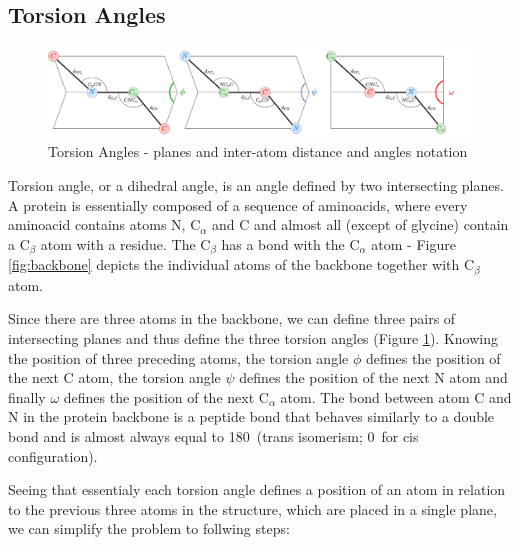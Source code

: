 \subsection{Torsion Angles}

\begin{figure}
    \centering
    \includegraphics[width=\linewidth]{imgs_tomas/torsion.png}
    \caption{Torsion Angles - planes and inter-atom distance and angles notation}
    \label{fig:torsion}
\end{figure}

Torsion angle, or a dihedral angle, is an angle defined by two intersecting planes. A protein is essentially composed of a sequence of aminoacids, where every aminoacid contains atoms N, C$_\alpha$ and C and almost all (except of glycine) contain a C$_\beta$ atom with a residue.
The C$_\beta$ has a bond with the C$_\alpha$ atom - Figure \ref{fig:backbone} depicts the individual atoms of the backbone together with C$_\beta$ atom.

Since there are three atoms in the backbone, we can define three pairs of intersecting planes and thus define the three torsion angles (Figure \ref{fig:torsion}). Knowing the position of three preceding atoms, the torsion angle $\phi$ defines the position of the next C atom, the torsion angle $\psi$ defines the position of the next N atom and finally $\omega$ defines the position of the next C$_\alpha$ atom. The bond between atom C and N in the protein backbone is a peptide bond that behaves similarly to a double bond and is almost always equal to 180\degree~(trans isomerism; 0\degree~for cis configuration).

Seeing that essentialy each torsion angle defines a position of an atom in relation to the previous three atoms in the structure, which are placed in a single plane, we can simplify the problem to follwing steps:

